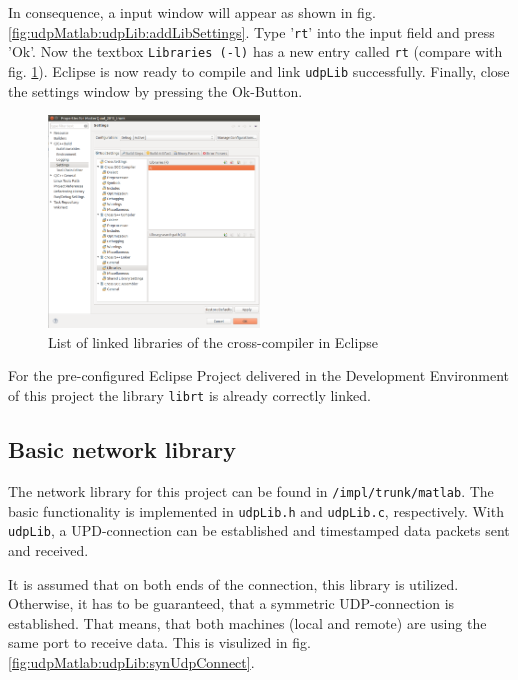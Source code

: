 In consequence, a input window will appear as shown in fig. \ref{fig:udpMatlab:udpLib:addLibSettings}. Type '\texttt{rt}' into the input field and press 'Ok'. Now the textbox \texttt{Libraries (-l)} has a new entry called \texttt{rt} (compare with fig. \ref{fig:udpMatlab:udpLib:addDoneSettings}). Eclipse is now ready to compile and link \texttt{udpLib} successfully. Finally, close the settings window by pressing the Ok-Button.

\begin{figure}[H]
    \centering
    \includegraphics[width=0.5\textwidth]{fig/ch-matlab-lib/projectAddDone}
    \caption[Resulting linker entry with librt]{List of linked libraries of the cross-compiler in Eclipse}
    \label{fig:udpMatlab:udpLib:addDoneSettings}
\end{figure}

For the pre-configured Eclipse Project delivered in the Development Environment of this project the library \texttt{librt} is already correctly linked.

\subsection{Basic network library}
\label{sec:udpMatlab:udpLib:basic}

The network library for this project can be found in \texttt{/impl/trunk/matlab}. The basic functionality is implemented in \texttt{udpLib.h} and \texttt{udpLib.c}, respectively. With \texttt{udpLib}, a UPD-connection can be established and timestamped data packets sent and received.

It is assumed that on both ends of the connection, this library is utilized. Otherwise, it has to be guaranteed, that a symmetric UDP-connection is established. That means, that both machines (local and remote) are using the same port to receive data. This is visulized in fig. \ref{fig:udpMatlab:udpLib:synUdpConnect}.


